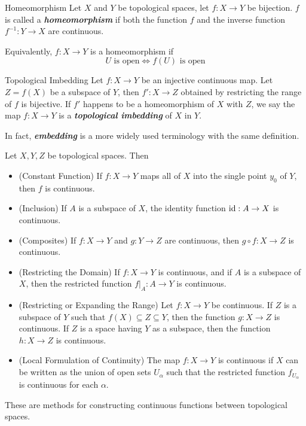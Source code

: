 \documentclass[12pt,a4paper]{article}
\begin{document}
    \begin{defi}{Homeomorphism}
        Let $X$ and $Y$ be topological spaces, let $f:X\to Y$ be bijection. $f$ is called a \textit{\textbf{homeomorphism}} if both the function $f$ and the inverse function $f^{-1}:Y\to X$ are continuous.
    \end{defi}
    \begin{remark}
        Equivalently, $f:X\to Y$ is a homeomorphism if
        $$
        U\text{ is open}\iff f(U)\text{ is open}
        $$
    \end{remark}
    \hfill

    \begin{defi}{Topological Imbedding}
        Let $f:X\to Y$ be an injective continuous map. Let $Z=f(X)$ be a subspace of $Y$, then $f':X\to Z$ obtained by restricting the range of $f$ is bijective. If $f'$ happens to be a homeomorphism of $X$ with $Z$, we say the map $f:X\to Y$ is a \textbf{\textit{topological imbedding}} of $X$ in $Y$.
    \end{defi}
    \begin{remark}
        In fact, \textbf{\textit{embedding}} is a more widely used terminology with the same definition. 
    \end{remark}
    \hfill

    \begin{thm}\label{2.7.8}
        Let $X,Y,Z$ be topological spaces. Then
        \begin{itemize}
            \item (Constant Function) If $f:X\to Y$ maps all of $X$ into the single point $y_0$ of $Y$, then $f$ is continuous.
            \item (Inclusion) If $A$ is a subspace of $X$, the identity function $\operatorname{id}:A\to X$ is continuous.
            \item (Composites) If $f:X\to Y$ and $g:Y\to Z$ are continuous, then $g\circ f:X\to Z$ is continuous.
            \item (Restricting the Domain) If $f:X\to Y$ is continuous, and if $A$ is a subspace of $X$, then the restricted function $f|_A:A\to Y$ is continuous.
            \item (Restricting or Expanding the Range) Let $f:X\to Y$ be continuous. If $Z$ is a subspace of $Y$ such that $f(X)\subseteq Z\subseteq Y$, then the function $g:X\to Z$ is continuous. If $Z$ is a space having $Y$ as a subspace, then the function $h:X\to Z$ is continuous.
            \item (Local Formulation of Continuity) The map $f:X\to Y$ is continuous if $X$ can be written as the union of open sets $U_\alpha$ such that the restricted function $f_{U_\alpha}$ is continuous for each $\alpha$.   
        \end{itemize}
    \end{thm}
    \begin{remark}
        These are methods for constructing continuous functions between topological spaces.
    \end{remark}
    \hfill
\end{document}
